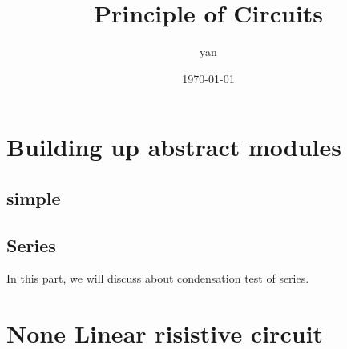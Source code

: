 \documentclass{book}
\title{Principle of Circuits}
\author{yan}
\date{\today}
\begin{document}
\frontmatter
\maketitle
\tableofcontents

\mainmatter
\part{Building up abstract modules}
\chapter{simple }
\chapter{Series}

In this part, we will discuss about condensation test of series.
\part{None Linear risistive circuit}
\end{document}
